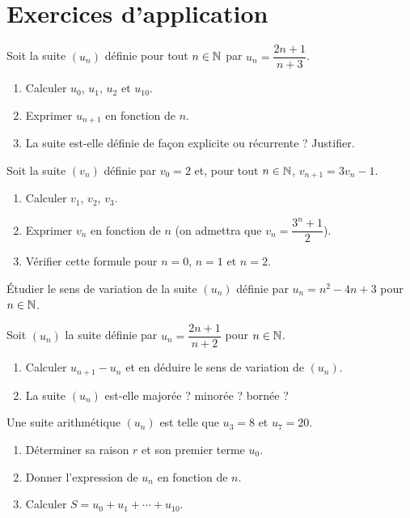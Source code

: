 \section{Exercices d'application}


\exo{}
Soit la suite $(u_n)$ définie pour tout $n\in\mathbb{N}$ par $u_n = \dfrac{2n+1}{n+3}$.
\begin{enumerate}[label=\alph*)]
\item Calculer $u_0$, $u_1$, $u_2$ et $u_{10}$.
\item Exprimer $u_{n+1}$ en fonction de $n$.
\item La suite est-elle définie de façon explicite ou récurrente ? Justifier.
\end{enumerate}

\exo{}
Soit la suite $(v_n)$ définie par $v_0 = 2$ et, pour tout $n\in\mathbb{N}$, $v_{n+1} = 3v_n - 1$.
\begin{enumerate}[label=\alph*)]
\item Calculer $v_1$, $v_2$, $v_3$.
\item Exprimer $v_n$ en fonction de $n$ (on admettra que $v_n = \dfrac{3^n + 1}{2}$).
\item Vérifier cette formule pour $n=0$, $n=1$ et $n=2$.
\end{enumerate}


\exo{}
Étudier le sens de variation de la suite $(u_n)$ définie par $u_n = n^2 - 4n + 3$ pour $n\in\mathbb{N}$.

\exo{}
Soit $(u_n)$ la suite définie par $u_n = \dfrac{2n+1}{n+2}$ pour $n\in\mathbb{N}$.
\begin{enumerate}[label=\alph*)]
\item Calculer $u_{n+1} - u_n$ et en déduire le sens de variation de $(u_n)$.
\item La suite $(u_n)$ est-elle majorée ? minorée ? bornée ?
\end{enumerate}


\exo{}
Une suite arithmétique $(u_n)$ est telle que $u_3 = 8$ et $u_7 = 20$.
\begin{enumerate}[label=\alph*)]
\item Déterminer sa raison $r$ et son premier terme $u_0$.
\item Donner l'expression de $u_n$ en fonction de $n$.
\item Calculer $S = u_0 + u_1 + \cdots + u_{10}$.
\end{enumerate}


